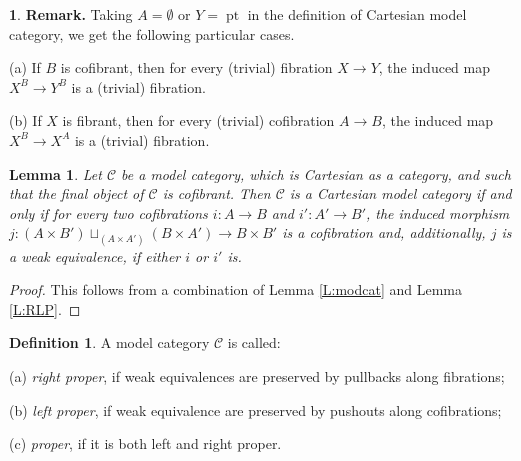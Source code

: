 \documentclass[12pt]{amsart}
\theoremstyle{plain}
\newtheorem{Lem}[Thm]{Lemma}
\theoremstyle{definition}
\newtheorem{Def}[Thm]{Definition}
\newtheorem{Emp}[Thm]{}
\numberwithin{equation}{section}
\newcommand{\cal}[1]{\mathcal{#1}}
\newcommand{\C}[1]{\cal#1}
\newcommand{\rl}[1]{Lemma \ref{L:#1}}
\newcommand{\pt}{\operatorname{pt}}
\begin{document}
\begin{Emp} \label{E:Cart}
{\bf Remark.} Taking $A=\emptyset$ or $Y=\pt$ in the definition of
Cartesian model category, we get the following particular cases.

(a) If $B$ is cofibrant, then for every (trivial) fibration $X\to
Y$, the induced map $X^B\to Y^B$ is a (trivial) fibration.

(b) If $X$ is fibrant, then for every (trivial) cofibration $A\to
B$, the induced map $X^B\to X^A$ is a (trivial) fibration.
\end{Emp}

\begin{Lem} \label{L:Cart}
Let ${\C{C}}$ be a model category, which is Cartesian as a
category, and such that the final object of ${\C{C}}$ is cofibrant.
Then ${\C{C}}$ is a Cartesian model category if and only if for
every two cofibrations $i:A\to B$ and $i':A'\to B'$, the
induced morphism $j:(A\times B')\sqcup_{(A\times A')}(B\times 
A')\to B\times B'$ is a cofibration and, additionally, $j$ is a
weak equivalence, if either $i$ or $i'$ is.
\end{Lem}

\begin{proof}
This follows from a combination of \rl{modcat} and \rl{RLP}.
\end{proof}

\begin{Def} \label{D:proper}
A model category ${\C{C}}$ is called:

(a) {\em right proper}, if weak equivalences are preserved by
pullbacks along fibrations;

(b) {\em left proper}, if weak equivalence are preserved by
pushouts along cofibrations;

(c) {\em proper}, if it is both left and right proper.
\end{Def}


%
%
\end{document}
